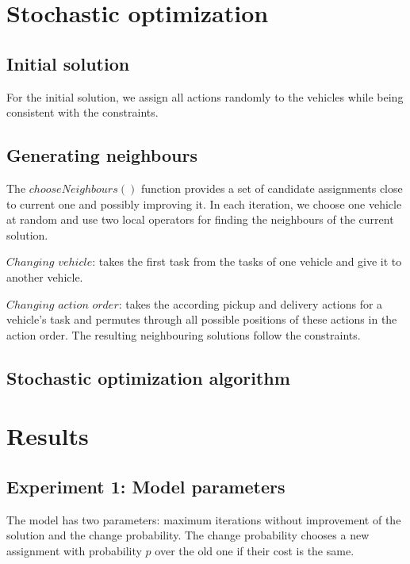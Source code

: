 \documentclass[11pt]{article}
\begin{document}
\section{Stochastic optimization}

\subsection{Initial solution}
For the initial solution, we assign all actions randomly to the vehicles while being consistent with the constraints. 

\subsection{Generating neighbours}
The $chooseNeighbours()$ function provides a set of candidate assignments close to current one and possibly improving it. 
In each iteration, we choose one vehicle at random and use two local operators for ﬁnding the neighbours of the current solution.
\begin{description}
	\item $Changing$ $vehicle$: takes the ﬁrst task from the tasks of one vehicle and give it to another vehicle.

	\item $Changing$ $action$ $order$: takes the according pickup and delivery actions for a vehicle's task and permutes through all possible positions of these actions in the action order. The resulting neighbouring solutions follow the constraints.
\end {description}

\subsection{Stochastic optimization algorithm}


\section{Results}

\subsection{Experiment 1: Model parameters}
The model has two parameters: maximum iterations without improvement of the solution and the change probability. The change probability  chooses a new assignment with probability $p$ over the old one if their cost is the same.
\end{document}
